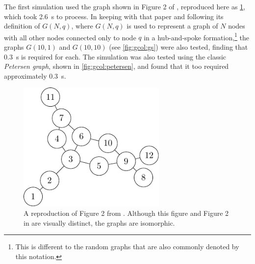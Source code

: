 The first simulation used the graph shown in Figure 2 of \cite{Gheorghe2013}, reproduced here as \cref{fig:gcol:gheorghefig2}, which took \qty{2.6}{\second} to process.  In keeping with that paper and following its definition of \(G(N,q)\), where \(G(N,q)\) is used to represent a graph of \(N\) nodes with all other nodes connected only to node \(q\) in a hub-and-spoke formation,\footnote{This is different to the random graphs that are also commonly denoted by this notation.} the graphs \(G(10,1)\) and \(G(10,10)\) (see \cref{fig:gcol:gs}) were also tested, finding that \qty{0.3}{\second} is required for each.  The simulation was also tested using the classic \emph{Petersen graph}, shown in \cref{fig:gcol:petersen}, and found that it too required approximately \qty{0.3}{\second}.

\begin{figure}
    \centering
    \includegraphics[width=0.65\textwidth]{chapters/gcol/figs/gheorghe-figure-2-figure0.pdf}
    \caption[A reproduction of the graph in Figure 2 of \cite{Gheorghe2013}]{\label{fig:gcol:gheorghefig2}A reproduction of Figure 2 from \cite{Gheorghe2013}.  Although this figure and Figure 2 in \cite{Gheorghe2013} are visually distinct, the graphs are isomorphic.}
\end{figure}

